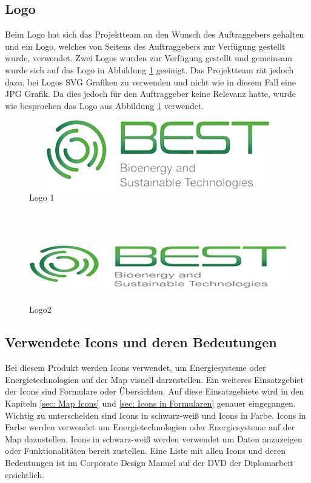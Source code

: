 \subsection{Logo}\label{sec: Logo}
Beim Logo hat sich das Projektteam an den Wunsch des Auftraggebers gehalten und ein Logo, welches von Seitens des Auftraggebers zur Verfügung gestellt wurde, verwendet. Zwei Logos wurden zur Verfügung gestellt und gemeinsam wurde sich auf das Logo in Abbildung \ref{fig: Logo1} geeinigt. Das Projektteam rät jedoch dazu, bei Logos SVG Grafiken zu verwenden und nicht wie in diesem Fall eine JPG Grafik. Da dies jedoch für den Auftraggeber keine Relevanz hatte, wurde wie besprochen das Logo aus Abbildung \ref{fig: Logo1}  verwendet.
\\
\begin{figure}[h]
	\centering
	\includegraphics[height=3cm,width=14cm]{images/Logo1}
	\caption{Logo 1}
	\label{fig: Logo1}
\end{figure}
\\
\begin{figure}[h]
	\centering
	\includegraphics[height=3cm,width=14cm]{images/Logo2}
	\caption{Logo2}
	\label{fig: Logo2}
\end{figure}

\newpage
\subsection{Verwendete Icons und deren Bedeutungen} \label{sec:Verwendete Icons und deren Bedeutungen}
Bei diesem Produkt werden Icons verwendet, um Energiesysteme oder Energietechnologien auf der Map visuell darzustellen. Ein weiteres Einsatzgebiet der Icons sind Formulare oder Übersichten. Auf diese Einsatzgebiete wird in den Kapiteln  \ref{sec: Map Icons} und \ref{sec: Icons in Formularen} genauer eingegangen. Wichtig zu unterscheiden sind Icons in schwarz-weiß und Icons in Farbe. Icons in Farbe werden verwendet um Energietechnologien oder Energiesysteme auf der Map dazustellen. Icons in schwarz-weiß werden verwendet um Daten anzuzeigen oder Funktionalitäten bereit zustellen.
Eine Liste mit allen Icons und deren Bedeutungen ist im Corporate Design Manuel auf der DVD der Diplomarbeit ersichtlich.




